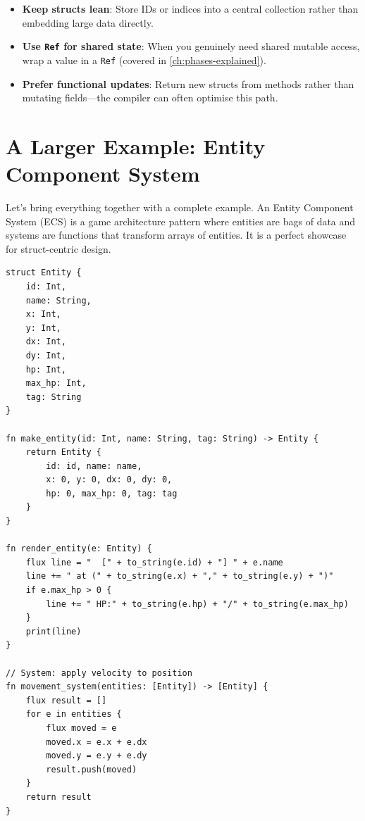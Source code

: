 \begin{itemize}
  \item \textbf{Keep structs lean}: Store IDs or indices into a central
    collection rather than embedding large data directly.
  \item \textbf{Use \lstinline|Ref| for shared state}: When you genuinely
    need shared mutable access, wrap a value in a \lstinline|Ref|
    (covered in \cref{ch:phases-explained}).
  \item \textbf{Prefer functional updates}: Return new structs from methods
    rather than mutating fields---the compiler can often optimise this path.
\end{itemize}

\section{A Larger Example: Entity Component System}\label{sec:struct-ecs}

Let's bring everything together with a complete example. An Entity Component
System (ECS) is a game architecture pattern where entities are bags of
data and systems are functions that transform arrays of entities. It is a
perfect showcase for struct-centric design.

\begin{lstlisting}[language=Lattice, caption={An ECS in Lattice}]
struct Entity {
    id: Int,
    name: String,
    x: Int,
    y: Int,
    dx: Int,
    dy: Int,
    hp: Int,
    max_hp: Int,
    tag: String
}

fn make_entity(id: Int, name: String, tag: String) -> Entity {
    return Entity {
        id: id, name: name,
        x: 0, y: 0, dx: 0, dy: 0,
        hp: 0, max_hp: 0, tag: tag
    }
}

fn render_entity(e: Entity) {
    flux line = "  [" + to_string(e.id) + "] " + e.name
    line += " at (" + to_string(e.x) + "," + to_string(e.y) + ")"
    if e.max_hp > 0 {
        line += " HP:" + to_string(e.hp) + "/" + to_string(e.max_hp)
    }
    print(line)
}

// System: apply velocity to position
fn movement_system(entities: [Entity]) -> [Entity] {
    flux result = []
    for e in entities {
        flux moved = e
        moved.x = e.x + e.dx
        moved.y = e.y + e.dy
        result.push(moved)
    }
    return result
}
\end{lstlisting}


